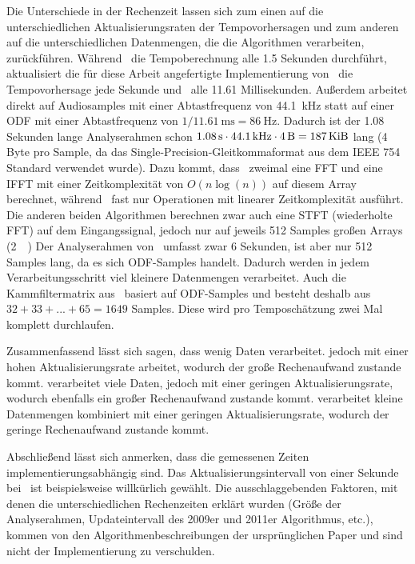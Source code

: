 {{		%
		Die Unterschiede in der Rechenzeit lassen sich zum einen auf die unterschiedlichen Aktualisierungsraten der Tempovorhersagen
			und zum anderen auf die unterschiedlichen Datenmengen,
			die die Algorithmen verarbeiten,
			zurückführen.
		Während~\cite{2009_DaPlSt} die Tempoberechnung alle \num{1.5} Sekunden durchführt,
			aktualisiert die für diese Arbeit angefertigte Implementierung von~\cite{2001_BeatThis} die Tempovorhersage jede Sekunde
			und~\cite{2011_PlRoSt} alle \num{11.61} Millisekunden.
		Au{\ss}erdem arbeitet \cite{2001_BeatThis} direkt auf Audiosamples
			mit einer Abtastfrequenz von \SI{44.1}{\kilo\hertz}
			statt auf einer \ac{ODF} mit einer Abtastfrequenz von $1 / \SI{11.61}{\milli\second} = \SI{86}{\hertz}$.
		Dadurch ist der \num{1.08} Sekunden lange Analyserahmen schon $\SI{1.08}{\second} \cdot \SI{44.1}{\kilo\hertz} \cdot \SI{4}{\byte} = \SI{187}{\kibi\byte}$ lang (\num{4} Byte pro Sample, da das Single-Precision-Gleitkommaformat aus dem \acs{IEEE} 754 Standard verwendet wurde).
		Dazu kommt,
			dass~\cite{2001_BeatThis} zweimal eine \ac{FFT} und eine \ac{IFFT} mit einer Zeitkomplexität von $O(n\log(n))$ auf diesem Array berechnet,
			während~\cite{2009_DaPlSt} fast nur Operationen mit linearer Zeitkomplexität ausführt.
		Die anderen beiden Algorithmen berechnen zwar auch eine \ac{STFT} (wiederholte \ac{FFT}) auf dem Eingangssignal,
			jedoch nur auf jeweils \num{512} Samples gro{\ss}en Arrays (\SI{2}{\kibi\byte})
		Der Analyserahmen von~\cite{2009_DaPlSt} umfasst zwar \num{6} Sekunden,
			ist aber nur \num{512} Samples lang,
			da es sich \ac{ODF}-Samples handelt.
		Dadurch werden in jedem Verarbeitungsschritt viel kleinere Datenmengen verarbeitet.
		Auch die Kammfiltermatrix aus~\cite{2011_PlRoSt} basiert auf \ac{ODF}-Samples
			und besteht deshalb aus $32 + 33 + ... + 65 = 1649$ Samples.
		Diese wird pro Temposchätzung zwei Mal komplett durchlaufen.

		Zusammenfassend lässt sich sagen,
			dass \cite{2011_PlRoSt} wenig Daten verarbeitet.
			jedoch mit einer hohen Aktualisierungsrate arbeitet,
			wodurch der gro{\ss}e Rechenaufwand zustande kommt.
		\cite{2001_BeatThis} verarbeitet viele Daten,
			jedoch mit einer geringen Aktualisierungsrate,
			wodurch ebenfalls ein gro{\ss}er Rechenaufwand zustande kommt.
		\cite{2009_DaPlSt} verarbeitet kleine Datenmengen kombiniert mit einer geringen Aktualisierungsrate,
			wodurch der geringe Rechenaufwand zustande kommt.

		Abschlie{\ss}end lässt sich anmerken,
			dass die gemessenen Zeiten implementierungsabhängig sind.
		Das Aktualisierungsintervall von einer Sekunde bei~\cite{2001_BeatThis} ist beispielsweise willkürlich gewählt.
		Die ausschlaggebenden Faktoren,
			mit denen die unterschiedlichen Rechenzeiten erklärt wurden
			(Grö{\ss}e der Analyserahmen, Updateintervall des 2009er und 2011er Algorithmus, etc.),
			kommen von den Algorithmenbeschreibungen der ursprünglichen Paper
			und sind nicht der Implementierung zu verschulden.
	}
}
